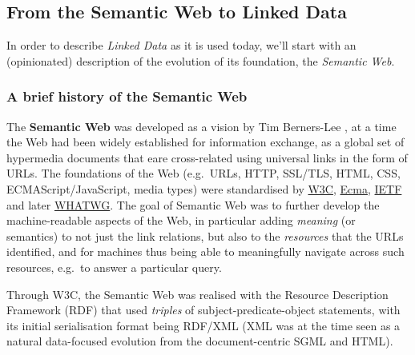 \documentclass[fleqn,10pt,lineno]{wlpeerjlua}
\begin{document}
\hypertarget{sec:ld}{%
\subsection*{From the Semantic Web to Linked Data}\label{sec:ld}}

In order to describe \emph{Linked Data} as it is used today, we'll start with an (opinionated) description of the evolution of its foundation, the \emph{Semantic Web}.

\hypertarget{sec:semweb}{%
\subsubsection*{A brief history of the Semantic Web}\label{sec:semweb}}

The \textbf{Semantic Web} was developed as a vision by Tim Berners-Lee \cite{Guy7cjVY}, at a time the Web had been widely established for information exchange, as a global set of hypermedia documents that eare cross-related using universal links in the form of URLs. The foundations of the Web (e.g.~URLs, HTTP, SSL/TLS, HTML, CSS, ECMAScript/JavaScript, media types) were standardised by \href{https://www.w3.org/standards/}{W3C}, \href{https://www.ecma-international.org/}{Ecma}, \href{https://www.ietf.org/standards/}{IETF} and later \href{https://whatwg.org/}{WHATWG}. The goal of Semantic Web was to further develop the machine-readable aspects of the Web, in particular adding \emph{meaning} (or semantics) to not just the link relations, but also to the \emph{resources} that the URLs identified, and for machines thus being able to meaningfully navigate across such resources, e.g.~to answer a particular query.

Through W3C, the Semantic Web was realised with the Resource Description Framework (RDF) \cite{16WGmCih8} that used \emph{triples} of subject-predicate-object statements, with its initial serialisation format \cite{16wvFH4nh} being RDF/XML (XML was at the time seen as a natural data-focused evolution from the document-centric SGML and HTML).
\end{document}
